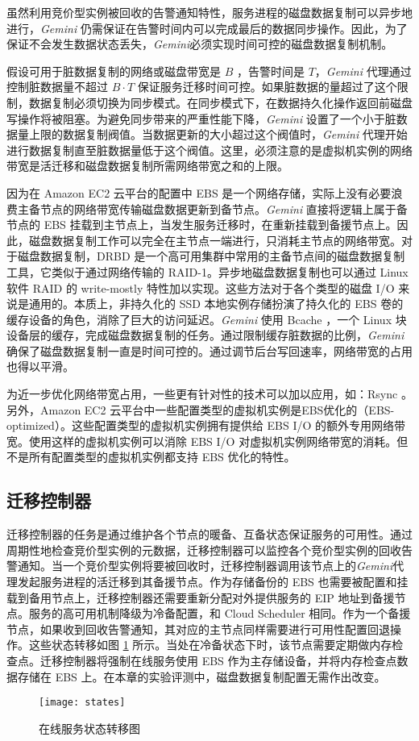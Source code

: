 虽然利用竞价型实例被回收的告警通知特性，服务进程的磁盘数据复制可以异步地进行，\emph{Gemini} 仍需保证在告警时间内可以完成最后的数据同步操作。因此，为了保证不会发生数据状态丢失，\emph{Gemini}必须实现时间可控的磁盘数据复制机制。

假设可用于脏数据复制的网络或磁盘带宽是 $B$ ，告警时间是 $T$，\emph{Gemini} 代理通过控制脏数据量不超过 $B \cdot T$ 保证服务迁移时间可控。如果脏数据的量超过了这个限制，数据复制必须切换为同步模式。在同步模式下，在数据持久化操作返回前磁盘写操作将被阻塞。为避免同步带来的严重性能下降，\emph{Gemini} 设置了一个小于脏数据量上限的数据复制阀值。当数据更新的大小超过这个阀值时，\emph{Gemini} 代理开始进行数据复制直至脏数据量低于这个阀值。这里，必须注意的是虚拟机实例的网络带宽是活迁移和磁盘数据复制所需网络带宽之和的上限。

因为在 Amazon EC2 云平台的配置中 EBS 是一个网络存储，实际上没有必要浪费主备节点的网络带宽传输磁盘数据更新到备节点。\emph{Gemini} 直接将逻辑上属于备节点的 EBS 挂载到主节点上，当发生服务迁移时，在重新挂载到备援节点上。因此，磁盘数据复制工作可以完全在主节点一端进行，只消耗主节点的网络带宽。对于磁盘数据复制，DRBD \cite{DRBD:2015} 是一个高可用集群中常用的主备节点间的磁盘数据复制工具，它类似于通过网络传输的 RAID-1。异步地磁盘数据复制也可以通过 Linux 软件 RAID \cite{Linux_md:2016} 的 write-mostly 特性加以实现。这些方法对于各个类型的磁盘 I/O 来说是通用的。本质上，非持久化的 SSD 本地实例存储扮演了持久化的 EBS 卷的缓存设备的角色，消除了巨大的访问延迟。\emph{Gemini} 使用 Bcache \cite{Bcache:2016}，一个 Linux 块设备层的缓存，完成磁盘数据复制的任务。通过限制缓存脏数据的比例，\emph{Gemini}确保了磁盘数据复制一直是时间可控的。通过调节后台写回速率，网络带宽的占用也得以平滑。

为近一步优化网络带宽占用，一些更有针对性的技术可以加以应用，如：Rsync \cite{Rsync:2016}。另外，Amazon EC2 云平台中一些配置类型的虚拟机实例是EBS优化的（EBS-optimized）。这些配置类型的虚拟机实例拥有提供给 EBS I/O 的额外专用网络带宽。使用这样的虚拟机实例可以消除 EBS I/O 对虚拟机实例网络带宽的消耗。但不是所有配置类型的虚拟机实例都支持 EBS 优化的特性。

\subsection{迁移控制器}
迁移控制器的任务是通过维护各个节点的暖备、互备状态保证服务的可用性。通过周期性地检查竞价型实例的元数据，迁移控制器可以监控各个竞价型实例的回收告警通知。当一个竞价型实例将要被回收时，迁移控制器调用该节点上的\emph{Gemini}代理发起服务进程的活迁移到其备援节点。作为存储备份的 EBS 也需要被配置和挂载到备用节点上，迁移控制器还需要重新分配对外提供服务的 EIP 地址到备援节点。服务的高可用机制降级为冷备配置，和 Cloud Scheduler \cite{He:2015:CCH:2749246.2749275} 相同。作为一个备援节点，如果收到回收告警通知，其对应的主节点同样需要进行可用性配置回退操作。这些状态转移如图 \ref{figure:states} 所示。当处在冷备状态下时，该节点需要定期做内存检查点。迁移控制器将强制在线服务使用 EBS 作为主存储设备，并将内存检查点数据存储在 EBS 上。在本章的实验评测中，磁盘数据复制配置无需作出改变。
\begin{figure}[]
  \centering
  \texttt{[image: states]}
  \caption{在线服务状态转移图}
  \label{figure:states}
\end{figure}

